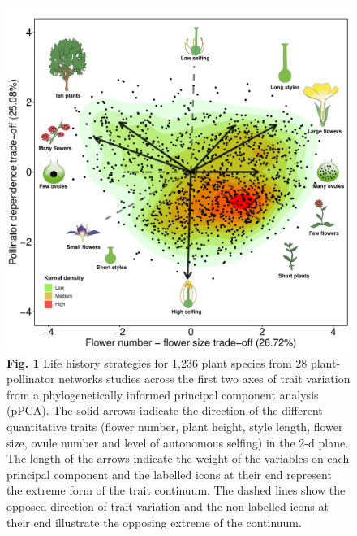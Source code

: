 \documentclass[12pt,a4paper,]{article}
\begin{document}
\begin{figure}
\centering
\includegraphics{output/figures/unnamed-chunk-1-1.pdf}
\caption{\label{fig:unnamed-chunk-1}\textbf{Fig. 1 \textbar{}} Life history
strategies for 1,236 plant species from 28 plant-pollinator networks
studies across the first two axes of trait variation from a
phylogenetically informed principal component analysis (pPCA). The solid
arrows indicate the direction of the different quantitative traits
(flower number, plant height, style length, flower size, ovule number
and level of autonomous selfing) in the 2-d plane. The length of the
arrows indicate the weight of the variables on each principal component
and the labelled icons at their end represent the extreme form of the
trait continuum. The dashed lines show the opposed direction of trait
variation and the non-labelled icons at their end illustrate the
opposing extreme of the continuum.}
\end{figure}
\end{document}
